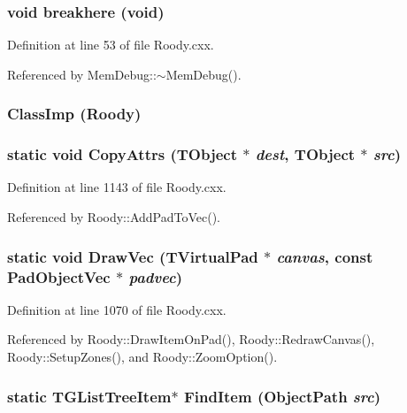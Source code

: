 \subsubsection[{breakhere}]{\setlength{\rightskip}{0pt plus 5cm}void breakhere (void)}\label{Roody_8cxx_a45fabe6b04ca0d46e19eafb959f7e224}


Definition at line 53 of file Roody.cxx.

Referenced by MemDebug::$\sim$MemDebug().
\subsubsection[{ClassImp}]{\setlength{\rightskip}{0pt plus 5cm}ClassImp ({\bf Roody})}\label{Roody_8cxx_a5861c5fc317d54e234ae903b790f66bc}
\subsubsection[{CopyAttrs}]{\setlength{\rightskip}{0pt plus 5cm}static void CopyAttrs (TObject $\ast$ {\em dest}, \/  TObject $\ast$ {\em src})\hspace{0.3cm}{\ttfamily  [static]}}\label{Roody_8cxx_a35052114725da8bb9a9096092e87faf3}


Definition at line 1143 of file Roody.cxx.

Referenced by Roody::AddPadToVec().
\subsubsection[{DrawVec}]{\setlength{\rightskip}{0pt plus 5cm}static void DrawVec (TVirtualPad $\ast$ {\em canvas}, \/  const {\bf PadObjectVec} $\ast$ {\em padvec})\hspace{0.3cm}{\ttfamily  [static]}}\label{Roody_8cxx_a476cf59022d4777bd4f30611b1060fe6}


Definition at line 1070 of file Roody.cxx.

Referenced by Roody::DrawItemOnPad(), Roody::RedrawCanvas(), Roody::SetupZones(), and Roody::ZoomOption().
\subsubsection[{FindItem}]{\setlength{\rightskip}{0pt plus 5cm}static TGListTreeItem$\ast$ FindItem (ObjectPath {\em src})\hspace{0.3cm}{\ttfamily  [static]}}\label{Roody_8cxx_aa45a52d0850f8e533dde19ee80e62194}



